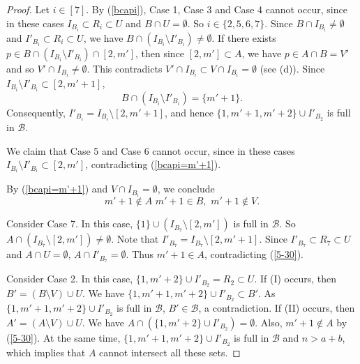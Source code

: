 \documentclass[10pt,a4paper]{amsart}
\newcommand{\m}{\mathcal}
\begin{document}
\begin{proof}
Let $i\in [7]$.
By (\ref{bcapi}),
Case 1, Case 3 and Case 4 cannot occur, since in these cases $I_{B_i}\subset R_i\subset U$ and $B\cap U=\emptyset$.
So $i\in \{2,5,6,7\}$. 
Since $B\cap I_{B_i}\ne \emptyset$ and $I'_{B_i}\subset R_i\subset U$, we have $B\cap (I_{B_i}\setminus I'_{B_i})\ne \emptyset$.
If there exists $p\in B\cap (I_{B_i}\setminus I'_{B_i})\cap [2,m']$, then since $[2,m']\subset A$, we have $p\in A\cap B=V'$ and so $V'\cap I_{B_i}\ne \emptyset$. This contradicts $V'\cap I_{B_i}\subset V\cap I_{B_i}= \emptyset$ (see (d)). 
Since $I_{B_i}\setminus I'_{B_i} \subset [2,m'+1]$,
\begin{equation}\label{bcapi=m'+1}
 B\cap (I_{B_i}\setminus I'_{B_i} )=\{m'+1\}.   
\end{equation}
Consequently, $I'_{B_i}=I_{B_i}\setminus [2,m'+1]$, and hence 
$\{1,m'+1,m'+2\}\cup I'_{B_2}$ is full in $\m B$. 

We claim that Case 5 and Case 6 cannot occur, since in these cases $I_{B_i}\setminus I'_{B_i} \subset [2,m']$, contradicting (\ref{bcapi=m'+1}).

By (\ref{bcapi=m'+1}) and $V\cap I_{B_i}=\emptyset$, we conclude 
\begin{equation}\label{5-30}
m'+1\not\in A\,\, m'+1\in B, \,\,m'+1\not\in V.    
\end{equation}

Consider Case 7. In this case, $\{1\}\cup (I_{B_7}\setminus [2,m'])$ is full in $\m B$. 
So $A\cap (I_{B_7}\setminus [2,m'])\ne \emptyset$.
Note that $I'_{B_7}=I_{B_7}\setminus [2,m'+1]$.
Since $I'_{B_7}\subset R_7\subset U$ and $A\cap U=\emptyset$, 
$A\cap I'_{B_7}=\emptyset$. Thus $m'+1\in A$, contradicting (\ref{5-30}).

Consider Case 2. In this case, $\{1,m'+2\}\cup I'_{B_2}=R_2\subset U$. 
If (I) occurs, then $B'=(B \setminus V)\cup U$.  We have 
$\{1,m'+1,m'+2\}\cup I'_{B_2}\subset B'$. 
As $\{1,m'+1,m'+2\}\cup I'_{B_2}$ is full in $\m B$, $B'\in \m B$, a contradiction.
If (II) occurs, then $A'=(A \setminus V)\cup U$. 
We have $A\cap (\{1,m'+2\}\cup I'_{B_2})=\emptyset$.  Also, $m'+1\notin A$ by (\ref{5-30}).  
At the same time, $\{1,m'+1,m'+2\}\cup I'_{B_2}$ is full in $\m B$ and $n>a+b$, which implies that $A$ cannot intersect all these sets.
\end{proof}
\end{document}
